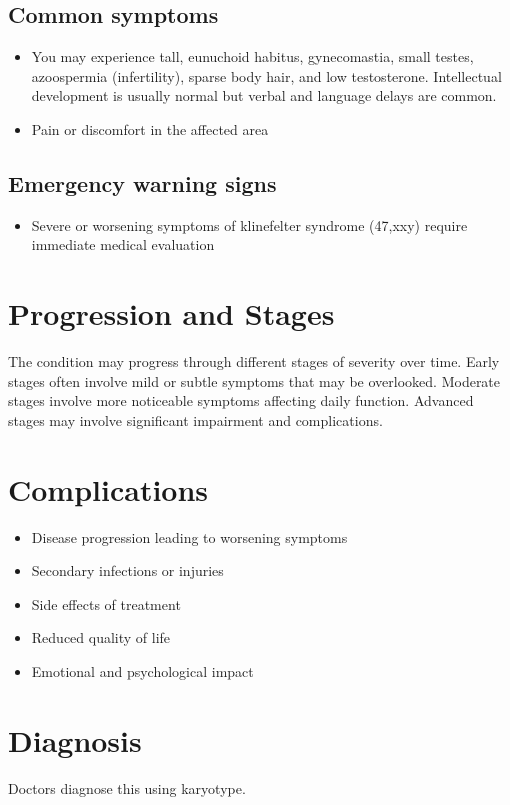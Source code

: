 \subsection{Common symptoms}
\begin{itemize}[noitemsep]
  \item You may experience tall, eunuchoid habitus, gynecomastia, small testes, azoospermia (infertility), sparse body hair, and low testosterone. Intellectual development is usually normal but verbal and language delays are common.
  \item Pain or discomfort in the affected area
  \end{itemize}

\subsection{Emergency warning signs}
\begin{itemize}[noitemsep]
  \item Severe or worsening symptoms of klinefelter syndrome (47,xxy) require immediate medical evaluation
\end{itemize}
\section{Progression and Stages}
The condition may progress through different stages of severity over time. Early stages often involve mild or subtle symptoms that may be overlooked. Moderate stages involve more noticeable symptoms affecting daily function. Advanced stages may involve significant impairment and complications.
\section{Complications}
\begin{itemize}[noitemsep]
  \item Disease progression leading to worsening symptoms
  \item Secondary infections or injuries
  \item Side effects of treatment
  \item Reduced quality of life
  \item Emotional and psychological impact
\end{itemize}
\section{Diagnosis}
Doctors diagnose this using karyotype.

